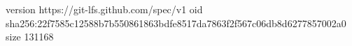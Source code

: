 version https://git-lfs.github.com/spec/v1
oid sha256:22f7585c12588b7b550861863bdfe8517da7863f2f567c06db8d6277857002a0
size 131168
